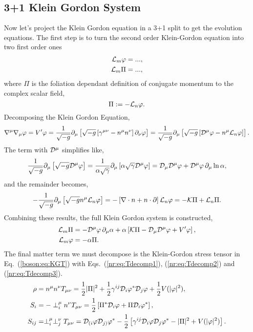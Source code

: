 \subsection{3+1 Klein Gordon System} \label{boson:sec:3+1kgeqn}
Now let's project the Klein Gordon equation in a 3+1 split to get the evolution equations. The first step is to turn the second order Klein-Gordon equation into two first order ones
\begin{align} 
\mathcal{L}_m \varphi = ... ,\\
\mathcal{L}_m \Pi = ... ,
\end{align}
where $\Pi$ is the foliation dependant definition of conjugate momentum to the complex scalar field,
\begin{equation} \Pi:= -\mathcal{L}_n \varphi. \label{boson:eq:Pidef}\end{equation}
Decomposing the Klein Gordon Equation,
\begin{equation} 
\nabla^\mu \nabla_\mu \varphi = V' \varphi = \frac{1}{\sqrt{-g}} \partial_\mu \left[ \sqrt{-g}\left[\gamma^{\mu\nu}-n^\mu n^\nu\right]\partial_\nu \varphi\right] = \frac{1}{\sqrt{-g}} \partial_\mu \left[ \sqrt{-g}\left[\mathcal{D}^\mu\varphi-n^\mu \mathcal{L}_n\varphi\right]\right]. 
\end{equation}
The term with $\mathcal{D}^\mu$ simplifies like,
\begin{equation}\frac{1}{\sqrt{-g}} \partial_\mu \left[ \sqrt{-g}\mathcal{D}^\mu\varphi\right] =  \frac{1}{\alpha\sqrt{\gamma}} \partial_\mu \left[\alpha\sqrt{\gamma}\mathcal{D}^\mu\varphi\right]  = \mathcal{D}_\mu \mathcal{D}^\mu \varphi + \mathcal{D}^\mu \varphi \,\partial_\mu \ln \alpha,\end{equation}
and the remainder becomes,
\begin{equation}-\frac{1}{\sqrt{-g}} \partial_\mu \left[ \sqrt{-g}n^\mu \mathcal{L}_n\varphi\right] = -\left[\nabla \cdot n + n\cdot \partial\right]\mathcal{L}_n\varphi = -\mathcal{K}\Pi + \mathcal{L}_n \Pi.\end{equation}
Combining these results, the full Klein Gordon system is constructed,
\begin{align}
 \mathcal{L}_m \Pi &= - \mathcal{D}^\mu\varphi\,\partial_\mu \alpha+\alpha\left[\mathcal{K}\Pi - \mathcal{D}_\mu \mathcal{D}^\mu \varphi  + V'\varphi\right], \\
 \mathcal{L}_m \varphi &= - \alpha\Pi.\end{align}
The final matter term we must decompose is the Klein-Gordon stress tensor in Eq.~(\ref{boson:eq:KGT}) with Eqs.~(\ref{nr:eq:Tdecomp1}), (\ref{nr:eq:Tdecomp2}) and (\ref{nr:eq:Tdecomp3}). \begin{align} \rho &=n^\mu n^\nu T_{\mu\nu} = \frac{1}{2}|\Pi|^2 + \frac{1}{2}\gamma^{ij}\mathcal{D}_i \varphi^* \mathcal{D}_j \varphi +\frac{1}{2}V(|\varphi|^2)
,\\ S_i &= -\perp^\mu_i n^\nu T_{\mu\nu} =  \frac{1}{2}\left[\Pi^* \mathcal{D}_i \varphi  +  \Pi\mathcal{D}_i \varphi^* \right]
,\\ S_{ij} &= \perp^\mu_i \perp^\nu_j T_{\mu\nu} = \mathcal{D}_{(i}\varphi\mathcal{D}_{j)}\varphi^* - \frac{1}{2}\left[ \gamma^{ij}\mathcal{D}_i\varphi\mathcal{D}_j\varphi^* - |\Pi|^2 + V(|\varphi|^2)\right].\end{align}

